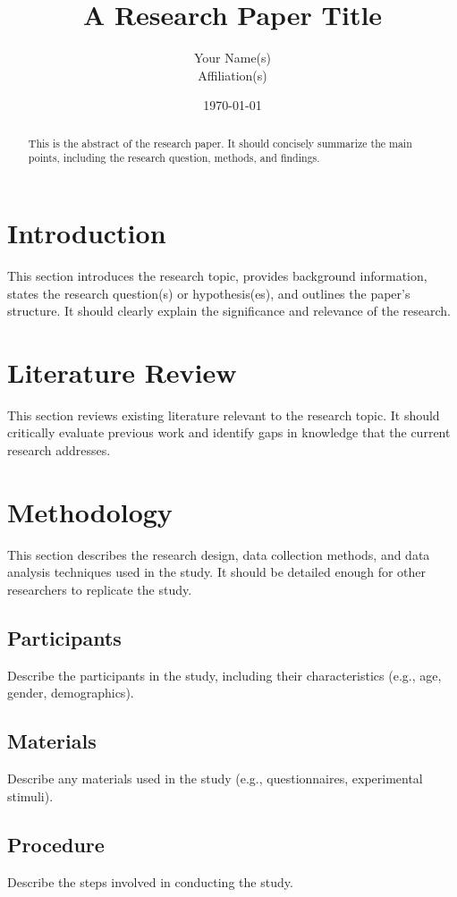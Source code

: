 \documentclass{article}
\title{A Research Paper Title}
\author{Your Name(s) \\ Affiliation(s)}
\date{\today}
\begin{document}
\maketitle

\begin{abstract}
This is the abstract of the research paper.  It should concisely summarize the main points, including the research question, methods, and findings.
\end{abstract}

\section{Introduction}
This section introduces the research topic, provides background information, states the research question(s) or hypothesis(es), and outlines the paper's structure.  It should clearly explain the significance and relevance of the research.

\section{Literature Review}
This section reviews existing literature relevant to the research topic. It should critically evaluate previous work and identify gaps in knowledge that the current research addresses.

\section{Methodology}
This section describes the research design, data collection methods, and data analysis techniques used in the study. It should be detailed enough for other researchers to replicate the study.

\subsection{Participants}
Describe the participants in the study, including their characteristics (e.g., age, gender, demographics).

\subsection{Materials}
Describe any materials used in the study (e.g., questionnaires, experimental stimuli).

\subsection{Procedure}
Describe the steps involved in conducting the study.
\end{document}
